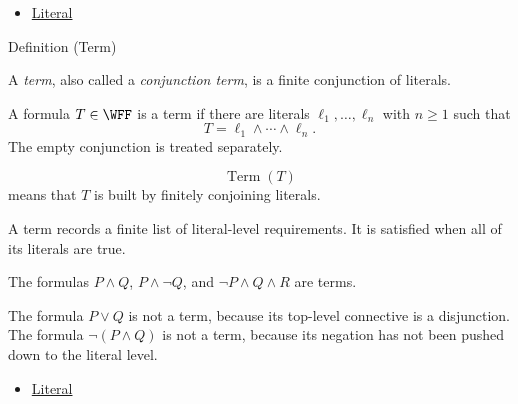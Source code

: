 \begin{dependencies}
\begin{itemize}
  \item \hyperref[def:literal-propositional-logic]{Literal}
\end{itemize}
\end{dependencies}

\begin{definitionbox}{Definition (Term)}
\begin{definition}[Term]
\label{def:term-propositional-logic}
A \emph{term}, also called a \emph{conjunction term}, is a finite conjunction
of literals.
\end{definition}
\end{definitionbox}

\begin{remark*}
A formula \(T\in\WFF\) is a term if there are literals
\(\ell_1,\ldots,\ell_n\) with \(n\ge 1\) such that
\[
T=\ell_1\land\cdots\land\ell_n.
\]
The empty conjunction is treated separately.
\end{remark*}

\begin{remark*}
\[
\operatorname{Term}(T)
\]
means that \(T\) is built by finitely conjoining literals.
\end{remark*}

\begin{remark*}[Interpretation]
A term records a finite list of literal-level requirements. It is satisfied
when all of its literals are true.
\end{remark*}

\begin{remark*}[Examples]
The formulas \(P\land Q\), \(P\land\neg Q\), and
\(\neg P\land Q\land R\) are terms.
\end{remark*}

\begin{remark*}
The formula \(P\lor Q\) is not a term, because its top-level connective is a
disjunction. The formula \(\neg(P\land Q)\) is not a term, because its negation
has not been pushed down to the literal level.
\end{remark*}

\begin{dependencies}
\begin{itemize}
  \item \hyperref[def:literal-propositional-logic]{Literal}
\end{itemize}
\end{dependencies}

